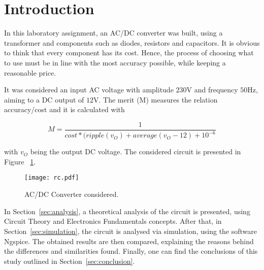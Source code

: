 \newpage
\section{Introduction}
\label{sec:introduction}
\vspace{4.5mm}
\par In this laboratory assignment, an AC/DC converter was built, using a transformer and components such as diodes, resistors and capacitors. It is obvious to think that every component has its cost. Hence, the process of choosing what to use must be in line with the most accuracy possible, while keeping a reasonable price.
\vspace{3mm}
\par It was considered an input AC voltage with amplitude $230$V and frequency $50$Hz, aiming to a DC output of $12$V. The merit (M) measures the relation accuracy/cost and it is calculated with

\begin{equation}
M=\frac{1}{cost*(ripple(v_O)+average(v_O-12)+10^{-6}}
\end{equation}

with $v_O$ being the output DC voltage.
The considered circuit is presented in Figure ~\ref{fig:rc}.
\vspace{3mm}

\begin{figure}[h] \centering
\texttt{[image: rc.pdf]}
\caption{AC/DC Converter considered.}
\label{fig:rc}
\end{figure}

\par In Section~\ref{sec:analysis}, a theoretical analysis of the circuit is presented, using Circuit Theory and Electronics Fundamentals concepts. After that, in Section~\ref{sec:simulation}, the circuit is analysed via simulation, using the software Ngspice. The obtained results are then compared, explaining the reasons behind the differences and similarities found. Finally, one can find the conclusions of this study outlined in Section~\ref{sec:conclusion}.
